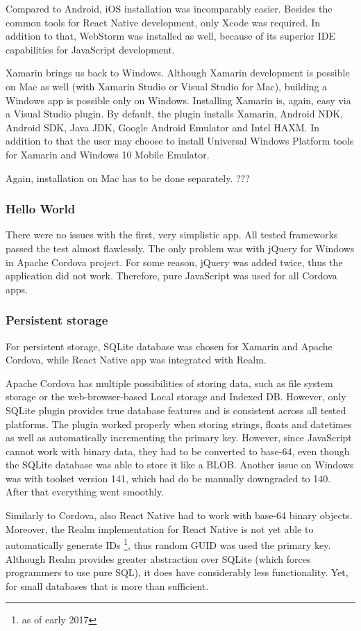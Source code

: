 \documentclass[english,master,public,dept460,male,cpdeclaration,oneside]{diploma}
\begin{document}
Compared to Android, iOS installation was incomparably easier. Besides the common tools for React Native development, only Xcode was required. In addition to that, WebStorm was installed as well, because of its superior IDE capabilities for JavaScript development.

Xamarin brings us back to Windows. Although Xamarin development is possible on Mac as well (with Xamarin Studio or Visual Studio for Mac), building a Windows app is possible only on Windows. Installing Xamarin is, again, easy via a Visual Studio plugin. By default, the plugin installs Xamarin, Android NDK, Android SDK, Java JDK, Google Android Emulator and Intel HAXM. In addition to that the user may choose to install Universal Windows Platform tools for Xamarin and Windows 10 Mobile Emulator. 

Again, installation on Mac has to be done separately. ???

\subsubsection{Hello World}
There were no issues with the first, very simplistic app. All tested frameworks passed the test almost flawlessly. The only problem was with jQuery for Windows in Apache Cordova project. For some reason, jQuery was added twice, thus the application did not work. Therefore, pure JavaScript was used for all Cordova apps.

\subsubsection{Persistent storage}
For persistent storage, SQLite database was chosen for Xamarin and Apache Cordova, while React Native app was integrated with Realm. 

Apache Cordova has multiple possibilities of storing data, such as file system storage or the web-browser-based Local storage and Indexed DB. However, only SQLite plugin provides true database features and is consistent across all tested platforms. The plugin worked properly when storing strings, floats and datetimes as well as automatically incrementing the primary key. However, since JavaScript cannot work with binary data, they had to be converted to base-64, even though the SQLite database was able to store it like a BLOB. Another issue on Windows was with toolset version 141, which had do be manually downgraded to 140. After that everything went smoothly.

Similarly to Cordova, also React Native had to work with base-64 binary objects. Moreover, the Realm implementation for React Native is not yet able to automatically generate IDs \footnote{as of early 2017}, thus random GUID was used the primary key. Although Realm provides greater abstraction over SQLite (which forces programmers to use pure SQL), it does have considerably less functionality. Yet, for small databases that is more than sufficient.
\end{document}
